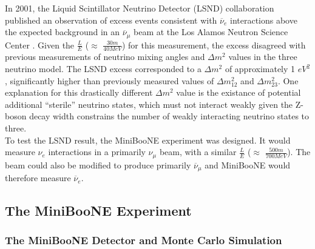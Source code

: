 In 2001, the Liquid Scintillator Neutrino Detector (LSND) collaboration published an observation of excess events consistent with $\overline{\nu}_e$ interactions above the expected background in an $\overline{\nu}_\mu$ beam at the Los Alamos Neutron Science Center \cite{LSNDPaper}. Given the $\frac{L}{E}$ ($\approx$ $\frac{30 m}{40 MeV}$) for this measurement, the excess disagreed with previous measurements of neutrino mixing angles and $\Delta m^2$ values in the three neutrino model. The LSND excess corresponded to a $\Delta m^2$ of approximately 1 $eV^2$, significantly higher than previously measured values of $\Delta m_{12}^2$ and $\Delta m_{23}^2$. One explanation for this drastically different $\Delta m^2$ value is the existance of potential additional ``sterile'' neutrino states, which must not interact weakly given the Z- boson decay width constrains the number of weakly interacting neutrino states to three.\\
To test the LSND result, the MiniBooNE experiment was designed. It would measure $\nu_e$ interactions in a primarily $\nu_\mu$ beam, with a similar $\frac{L}{E}$ ($\approx$ $\frac{500m}{700 MeV}$). The beam could also be modified to produce primarily $\overline{\nu}_\mu$ and MiniBooNE would therefore measure $\overline{\nu}_e$.



\subsection{The MiniBooNE Experiment}

\subsubsection{The MiniBooNE Detector and Monte Carlo Simulation}



